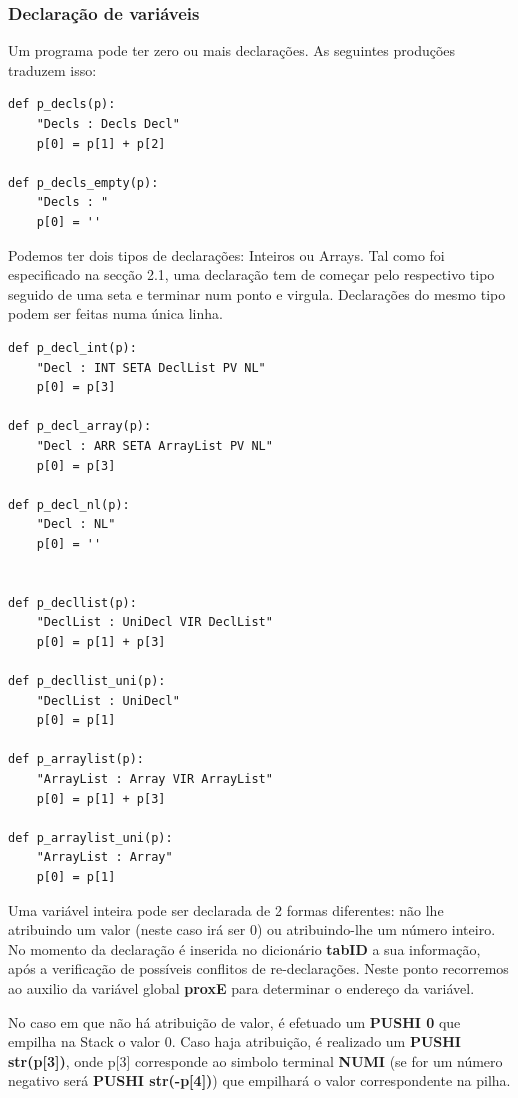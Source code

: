 \documentclass{article}
\begin{document}

\subsubsection {Declaração de variáveis}
\setlength{\parindent}{5ex}Um programa pode ter zero ou mais declarações. As seguintes produções traduzem isso:
\begin{lstlisting}[firstnumber=13]
def p_decls(p):
    "Decls : Decls Decl"
    p[0] = p[1] + p[2]

def p_decls_empty(p):
    "Decls : "
    p[0] = ''
\end{lstlisting}

\par Podemos ter dois tipos de declarações: Inteiros ou Arrays. Tal como foi especificado na secção 2.1, uma declaração tem de começar pelo respectivo tipo seguido de uma seta e terminar num ponto e virgula. Declarações do mesmo tipo podem ser feitas numa única linha.

\begin{lstlisting}[firstnumber=22]
def p_decl_int(p):
    "Decl : INT SETA DeclList PV NL"
    p[0] = p[3]

def p_decl_array(p):
    "Decl : ARR SETA ArrayList PV NL"
    p[0] = p[3]

def p_decl_nl(p):
    "Decl : NL"
    p[0] = ''


def p_decllist(p):
    "DeclList : UniDecl VIR DeclList"
    p[0] = p[1] + p[3]

def p_decllist_uni(p):
    "DeclList : UniDecl"
    p[0] = p[1]

def p_arraylist(p):
    "ArrayList : Array VIR ArrayList"
    p[0] = p[1] + p[3]

def p_arraylist_uni(p):
    "ArrayList : Array"
    p[0] = p[1]
\end{lstlisting}

\par Uma variável inteira pode ser declarada de 2 formas diferentes: não lhe atribuindo um valor (neste caso irá ser 0) ou atribuindo-lhe um número inteiro. No momento da declaração é inserida no dicionário \textbf{tabID} a sua informação, após a verificação de possíveis conflitos de re-declarações. Neste ponto recorremos ao auxilio da variável global \textbf{proxE} para determinar o endereço da variável.
\par No caso em que não há atribuição de valor, é efetuado um \textbf{PUSHI 0} que empilha na Stack o valor 0. Caso haja atribuição, é realizado um \textbf{PUSHI str(p[3])}, onde p[3] corresponde ao simbolo terminal \textbf{NUMI} (se for um número negativo será \textbf{PUSHI str(-p[4])}) que empilhará o valor correspondente na pilha.
\end{document}
